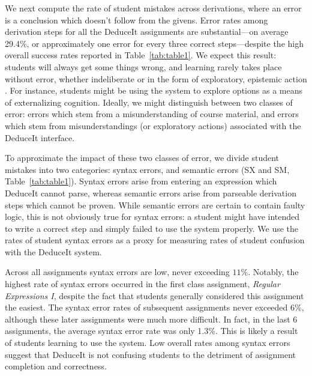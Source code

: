 \documentclass{sigchi}
\newcommand{\msb}[1]{\textbf{\textcolor{cyan}{Michael: #1}}}
\begin{document}
We next compute the rate of student mistakes across derivations, where an error is a conclusion which doesn't follow from the givens. Error rates among derivation steps for all the DeduceIt assignments are substantial---on average 29.4\%, or approximately one error for every three correct steps---despite the high overall success rates reported in Table~\ref{tab:table1}. We expect this result: students will always get some things wrong, and learning rarely takes place without error, whether indeliberate or in the form of exploratory, epistemic action \cite{citeulike}. For instance, students might be using the system to explore options as a means of externalizing cognition. Ideally, we might distinguish between two classes of error: errors which stem from a misunderstanding of course material, and errors which stem from misunderstandings (or exploratory actions) associated with the DeduceIt interface. %

To approximate the impact of these two classes of error, we divide student mistakes into two categories: syntax errors, and semantic errors (SX and SM, Table~\ref{tab:table1}). Syntax errors arise from entering an expression which DeduceIt cannot parse, whereas semantic errors arise from parseable derivation steps which cannot be proven. While semantic errors are certain to contain faulty logic, this is not obviously true for syntax errors: a student might have intended to write a correct step and simply failed to use the system properly. We use the rates of student syntax errors as a proxy for measuring rates of student confusion with the DeduceIt system.

Across all assignments syntax errors are low, never exceeding $11\%$. Notably, the highest rate of syntax errors occurred in the first class assignment, \textit{Regular Expressions I}, despite the fact that students generally considered this assignment the easiest. The syntax error rates of subsequent assignments never exceeded $6\%$, although these later assignments were much more difficult. In fact, in the last 6 assignments, the average syntax error rate was only 1.3\%. This is likely a result of students learning to use the system. Low overall rates among syntax errors suggest that DeduceIt is not confusing students to the detriment of assignment completion and correctness.
\end{document}
